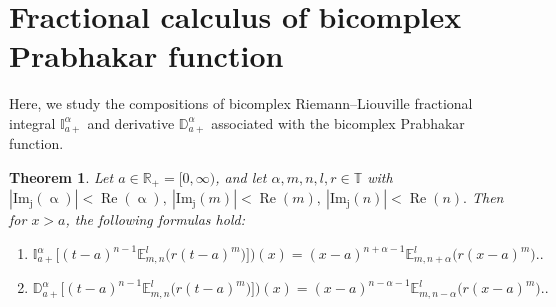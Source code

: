 \documentclass[a4paper,12pt]{article}
\newtheorem{theorem}{Theorem}[section]
\theoremstyle{remark}
\begin{document}
	
\section {Fractional calculus of bicomplex Prabhakar function}

\noindent 
Here, we study the  compositions of bicomplex Riemann–Liouville fractional integral $\mathbb{I}_{a+}^{\alpha}$ and derivative $\mathbb{D}_{a+}^{\alpha} $ \cite{goswami2022riemann,goswami2021generalization} associated with the bicomplex Prabhakar function.
\begin{theorem}\label{th:frac pr}
	Let $a \in \mathbb{R}_{+} = [0, \infty)$, and let $\alpha, m, n, l, r \in \mathbb{T}$ with $|\operatorname{Im_j}(\upalpha)|<\operatorname{Re}(\upalpha),~|\operatorname{Im_j}(m )|<\operatorname{Re}(m),~|\operatorname{Im_j}(n )|<\operatorname{Re}(n).$
	 Then for $x > a$, the following formulas hold:
	

	\begin{enumerate}
	\item 
	$	\mathbb{I}_{a+}^{\alpha} \big[(t - a)^{n - 1} \mathbb{E}_{m, n}^{l}\big(r (t - a)^{m}\big)\big])(x)
	=(x - a)^{n + \alpha - 1} \mathbb{E}_{m, n + \alpha}^{l}\big(r (x - a)^{m})\big..$ 
	\item 
$	\mathbb{D}_{a+}^{\alpha} \big[(t - a)^{n - 1} \mathbb{E}_{m, n}^{l}\big(r (t - a)^{m}\big)\big])(x)
	=(x - a)^{n - \alpha - 1} \mathbb{E}_{m, n - \alpha}^{l}\big(r (x - a)^{m})\big..$
\end{enumerate}

\end{theorem}
\end{document}
